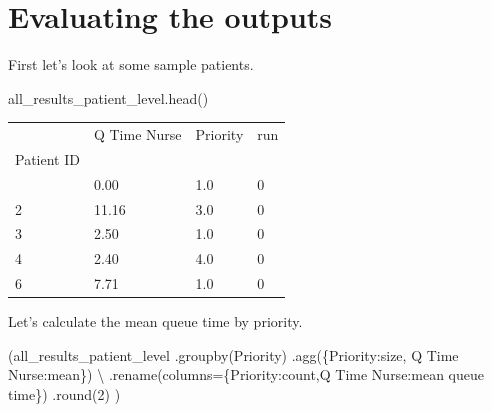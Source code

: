 \documentclass[
  letterpaper,
  DIV=11,
  numbers=noendperiod]{scrreprt}
\newenvironment{Shaded}{}{}
\newcommand{\BuiltInTok}[1]{\textcolor[rgb]{0.84,0.23,0.29}{#1}}
\newcommand{\DecValTok}[1]{\textcolor[rgb]{0.00,0.36,0.77}{#1}}
\newcommand{\NormalTok}[1]{\textcolor[rgb]{0.14,0.16,0.18}{#1}}
\newcommand{\OperatorTok}[1]{\textcolor[rgb]{0.14,0.16,0.18}{#1}}
\newcommand{\StringTok}[1]{\textcolor[rgb]{0.01,0.18,0.38}{#1}}
\begin{document}
\section{Evaluating the outputs}\label{evaluating-the-outputs-2}

First let's look at some sample patients.

\begin{Shaded}
\begin{Highlighting}[]
\NormalTok{all\_results\_patient\_level.head()}
\end{Highlighting}
\end{Shaded}

\begin{longtable}[]{@{}llll@{}}
\toprule\noalign{}
& Q Time Nurse & Priority & run \\
Patient ID & & & \\
\midrule\noalign{}
\endhead
\bottomrule\noalign{}
\endlastfoot
1 & 0.00 & 1.0 & 0 \\
2 & 11.16 & 3.0 & 0 \\
3 & 2.50 & 1.0 & 0 \\
4 & 2.40 & 4.0 & 0 \\
6 & 7.71 & 1.0 & 0 \\
\end{longtable}

Let's calculate the mean queue time by priority.

\begin{Shaded}
\begin{Highlighting}[]
\NormalTok{(all\_results\_patient\_level}
\NormalTok{    .groupby(}\StringTok{\textquotesingle{}Priority\textquotesingle{}}\NormalTok{)}
\NormalTok{    .agg(\{}\StringTok{\textquotesingle{}Priority\textquotesingle{}}\NormalTok{:}\StringTok{\textquotesingle{}size\textquotesingle{}}\NormalTok{, }\StringTok{\textquotesingle{}Q Time Nurse\textquotesingle{}}\NormalTok{:}\StringTok{\textquotesingle{}mean\textquotesingle{}}\NormalTok{\}) }\OperatorTok{\textbackslash{}}
\NormalTok{    .rename(columns}\OperatorTok{=}\NormalTok{\{}\StringTok{\textquotesingle{}Priority\textquotesingle{}}\NormalTok{:}\StringTok{\textquotesingle{}count\textquotesingle{}}\NormalTok{,}\StringTok{\textquotesingle{}Q Time Nurse\textquotesingle{}}\NormalTok{:}\StringTok{\textquotesingle{}mean queue time\textquotesingle{}}\NormalTok{\})}
\NormalTok{    .}\BuiltInTok{round}\NormalTok{(}\DecValTok{2}\NormalTok{)}
\NormalTok{    )}
\end{Highlighting}
\end{Shaded}
\end{document}
